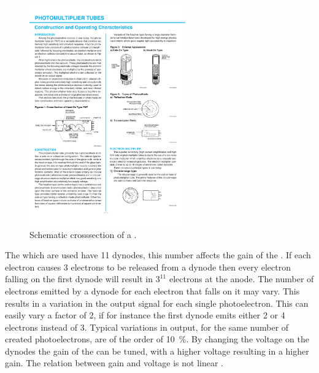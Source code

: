 \begin{figure}
    \centering
    \includegraphics[width=0.6\textwidth]
                    {plots/station/pmt_schematic}
    \caption{Schematic crosssection of a \pmt.}
    \label{fig:pmt_schematic}
\end{figure}

The \pmts which are used have 11 dynodes, this number affects the gain of the \pmt. If each electron causes \num{3} electrons to be released from a dynode then every electron falling on the first dynode will result in $3^11$ electrons at the anode. The number of electrons emitted by a dynode for each electron that falls on it may vary. This results in a variation in the output signal for each single photoelectron. This can easily vary a factor of 2, if for instance the first dynode emits either 2 or 4 electrons instead of 3. Typical variations in output, for the same number of created photoelectrons, are of the order of \SI{10}{\percent}. By changing the voltage on the dynodes the gain of the \pmt can be tuned, with a higher voltage resulting in a higher gain. The relation between gain and voltage is not linear \cite{hamamatsu2007handbook}.

